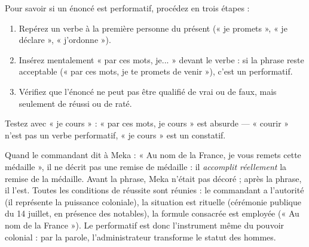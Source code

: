 \documentclass[11pt]{article}
\newcommand{\cle}[1]{{\popxbold\color{popdark}#1}}
\begin{document}
\begin{methode}
Pour savoir si un énoncé est performatif, procédez en trois étapes :
\begin{enumerate}
\item Repérez un verbe à la première personne du présent (« je promets », « je déclare », « j'ordonne »).
\item Insérez mentalement « \cle{par ces mots, je...} » devant le verbe : si la phrase reste acceptable (« par ces mots, je te promets de venir »), c'est un performatif.
\item Vérifiez que l'énoncé ne peut pas être qualifié de vrai ou de faux, mais seulement de réussi ou de raté.
\end{enumerate}
Testez avec « je cours » : « par ces mots, je cours » est absurde — « courir » n'est pas un verbe performatif, « je cours » est un constatif.
\end{methode}

\begin{exemplebox}
Quand le commandant dit à Meka : « Au nom de la France, je vous remets cette médaille », il ne décrit pas une remise de médaille : il \emph{accomplit réellement} la remise de la médaille. Avant la phrase, Meka n'était pas décoré ; après la phrase, il l'est. Toutes les conditions de réussite sont réunies : le commandant a l'autorité (il représente la puissance coloniale), la situation est rituelle (cérémonie publique du 14 juillet, en présence des notables), la formule consacrée est employée (« Au nom de la France »). Le performatif est donc l'instrument même du \cle{pouvoir colonial} : par la parole, l'administrateur transforme le statut des hommes.
\end{exemplebox}
\end{document}
